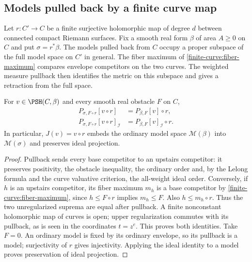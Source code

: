 \subsection{Models pulled back by a finite curve map}
\label{subsec:finite-curve-pullback-models}

Let $r:C'\to C$ be a finite surjective holomorphic map of
degree $d$ between connected compact Riemann surfaces. Fix a
smooth real form $\beta$ of area $A\geq0$ on $C$ and put
$\sigma=r^*\beta$. The models pulled back from $C$ occupy a
proper subspace of the full model space on $C'$ in general.
The fiber maximum of \cref{finite-curve:fiber-maximum} compares
envelope competitors on the two curves. The weighted measure
pullback then identifies the metric on this subspace and gives
a retraction from the full space.

\begin{proposition}\label{finite-curve:envelope-pullback}
For $v\in\PSH(C,\beta)$ and every smooth real obstacle $F$ on $C$,
\[
 \begin{aligned}
 P_{\sigma,F\circ r}[v\circ r]
       &=P_{\beta,F}[v]\circ r,\\
 P_{\sigma,F\circ r}[v\circ r]_{\mathcal I}
       &=P_{\beta,F}[v]_{\mathcal I}\circ r.
 \end{aligned}
\]
In particular, $J(v)=v\circ r$ embeds the ordinary model space
$\mathcal M(\beta)$ into $\mathcal M(\sigma)$ and preserves
ideal projection.
\end{proposition}
\begin{proof}
Pullback sends every base competitor to an upstairs competitor:
it preserves positivity, the obstacle inequality, the ordinary
order and, by the Lelong formula and the curve valuative
criterion, the all-weight ideal order.
Conversely, if $h$ is an upstairs competitor, its fiber maximum
$m_h$ is a base competitor by
\cref{finite-curve:fiber-maximum}, since $h\leq F\circ r$
implies $m_h\leq F$. Also $h\leq m_h\circ r$.
Thus the two unregularized suprema are equal after pullback.
A finite nonconstant holomorphic map of curves is open;
upper regularization commutes with its pullback, as is seen
in the coordinates $t=z^e$. This proves both identities.
Take $F=0$. An ordinary model is fixed by its ordinary
envelope, so its pullback is a model; surjectivity of $r$
gives injectivity. Applying the ideal identity to a model
proves preservation of ideal projection.
\end{proof}


